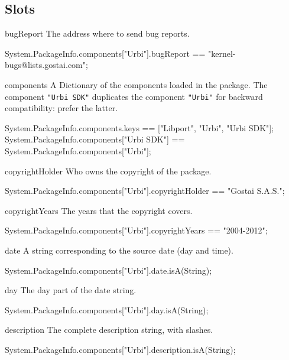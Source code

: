 \subsection{Slots}
\begin{urbiscriptapi}
\item[bugReport] The address where to send bug reports.
\begin{urbiassert}
System.PackageInfo.components["Urbi"].bugReport
  == "kernel-bugs@lists.gostai.com";
\end{urbiassert}


\item[components] A Dictionary of the components loaded in the package.  The
  component \lstinline|"Urbi SDK"| duplicates the component
  \lstinline|"Urbi"| for backward compatibility: prefer the latter.
\begin{urbiassert}
System.PackageInfo.components.keys
  == ["Libport", "Urbi", "Urbi SDK"];
System.PackageInfo.components["Urbi SDK"]
  == System.PackageInfo.components["Urbi"];
\end{urbiassert}


\item[copyrightHolder] Who owns the copyright of the package.
\begin{urbiassert}
System.PackageInfo.components["Urbi"].copyrightHolder
  == "Gostai S.A.S.";
\end{urbiassert}


\item[copyrightYears] The years that the copyright covers.
\begin{urbiassert}
System.PackageInfo.components["Urbi"].copyrightYears
  == "2004-2012";
\end{urbiassert}


\item[date] A string corresponding to the source date (day and time).
\begin{urbiassert}
System.PackageInfo.components["Urbi"].date.isA(String);
\end{urbiassert}


\item[day] The day part of the date string.
\begin{urbiassert}
System.PackageInfo.components["Urbi"].day.isA(String);
\end{urbiassert}


\item[description] The complete description string, with slashes.
\begin{urbiassert}
System.PackageInfo.components["Urbi"].description.isA(String);
\end{urbiassert}



\end{urbiscriptapi}

